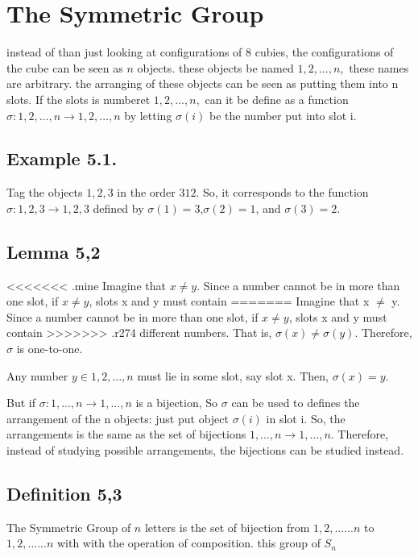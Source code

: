 \section{The Symmetric Group}

instead of than just looking at configurations of 8 cubies, the configurations of the cube can be seen as $n$ objects. 
these objects be named $1, 2, . . . , n,$ these names are arbitrary. the arranging of these objects can be seen as
putting them into n slots. If the slots is numberet $1, 2, . . . , n,$ can it be define as a function $\sigma : {1, 2, . . . , n} \rightarrow
{1, 2, . . . , n}$ by letting $\sigma(i)$ be the number put into slot i.

\subsection{Example 5.1.} 
Tag the objects $1, 2, 3$ in the order $3 1 2$. So, it corresponds to the function $\sigma: {1, 2, 3} \rightarrow {1, 2, 3}$
defined by $\sigma(1) = 3$,$\sigma(2) = 1$, and $\sigma(3) = 2$.

\subsection{Lemma 5,2}
<<<<<<< .mine
Imagine that $x\neq y$. Since a number cannot be in more than one slot, if $x \neq y$, slots x and y must contain
=======
Imagine that x $\neq$ y. Since a number cannot be in more than one slot, if $x \neq y$, slots x and y must contain
>>>>>>> .r274
different numbers. That is, $\sigma(x) \neq \sigma(y)$. Therefore, $\sigma$ is one-to-one.

Any number $y \in {1, 2, . . . , n}$ must lie in some slot, say slot x. Then, $\sigma(x) = y$.

But if $\sigma: {1, . . . , n} \rightarrow {1, . . . , n}$ is a bijection, So $\sigma$ can be used to defines the arrangement of the n
objects: just put object $\sigma(i)$ in slot i. So, the arrangements is the same as the set of
bijections ${1, . . . , n} \rightarrow {1, . . . , n}$. Therefore, instead of studying possible arrangements, the bijections can be studied instead.

\subsection{Definition 5,3}

The Symmetric Group of $n$ letters is the set of bijection from ${1,2,......n}$ to ${1,2,......n}$ with with the operation of composition.
this group of $S_n$

